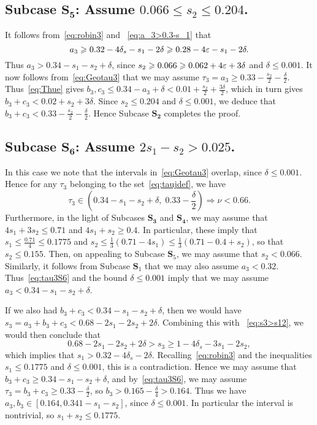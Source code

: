 \subsection*{Subcase $\mathbf{S_5}$: Assume $0.066\leq s_2\leq
0.204$.}

It follows from~\eqref{eq:robin3} and
~\eqref{eq:a_3>0.3-s_1} that
\[
a_3 \geqslant 0.32-4\delta_s-s_1 -2\delta \geqslant 0.28-4\varepsilon-s_1 -2\delta.
\]
Thus
$a_3>0.34-s_1-s_2 +\delta$, since $s_2\geqslant 0.066 \geqslant 0.062+4\varepsilon +3\delta$ and $\delta\leq 0.001$.
It now follows from~\eqref{eq:Geotau3} that we may assume $\tau_3=a_3 \geq 0.33
-\frac{s_2}{2}-
\frac{\delta}{2}$.
Thus~\eqref{eq:Thue} gives
$b_3,c_3 \le 0.34-a_3 +\delta< 0.01 +\frac{s_2}{2}+ \frac{3\delta}{2}$, which in turn gives
$b_3+c_3 < 0.02+s_2 +3\delta$.
Since $s_2\leq 0.204$ and $\delta\leq 0.001$, we deduce that
$b_3+c_3<0.33-\frac{s_2}{2}-\frac{\delta}{2}$. Hence
Subcase $\mathbf{S_2}$ completes the proof.


\subsection*{Subcase $\mathbf{S_6}$: Assume $2s_1-s_2>0.025$.}

In this case we note that the intervals in~\eqref{eq:Geotau3} overlap, since $\delta\leq 0.001$.
Hence for any $\tau_3$ belonging to the set~\eqref{eq:taujdef}, we have
\begin{equation}\label{eq:tau3S6}
\tau_3\in
 \left(0.34-s_1-s_2+ \delta, \;
 0.33-\frac{\delta}{2}\right)
 \Longrightarrow
\nu < 0.66.
\end{equation}
Furthermore,
in the light of Subcases $\mathbf{S_3}$ and $\mathbf{S_4}$, we may assume that
 $4s_1+3s_2\leq 0.71$ and $4s_1+s_2\geq 0.4$. In particular, these imply
 that $s_1\leq \frac{0.71}{4}\leq 0.1775$ and
 $s_2 \leq \frac{1}{3}(0.71 - 4s_1) \leq \frac{1}{3}(0.71-0.4+s_2)$, so that $s_2\leq 0.155$. Then, on appealing to Subcase
 $\mathbf{S}_5$, we may assume that $s_2< 0.066$. Similarly, it follows from Subcase $\mathbf{S}_1$ that we may also assume $a_3<0.32$. Thus~\eqref{eq:tau3S6} and the bound $\delta\leq 0.001$ imply that we may assume $a_3< 0.34-s_1-s_2+ \delta$.

If we also had $b_3+c_3<0.34-s_1-s_2+\delta$, then we would have $s_3 = a_3 + b_3 +c_3 < 0.68-2s_1-2s_2+2\delta$. Combining this with
~\eqref{eq:s3>s12}, we would then conclude that
\[
0.68-2s_1-2s_2+2\delta>
s_3 \ge 1-4\delta_s-3s_1-2s_2,
\]
which implies that
$s_1>0.32-4\delta_s-2\delta$.
Recalling~\eqref{eq:robin3} and the inequalities
$s_1\leq 0.1775$ and $\delta\leq 0.001$, this is a contradiction.
 Hence we may assume that $b_3+c_3\ge 0.34-s_1-s_2+ \delta$, and by~\eqref{eq:tau3S6}, we may assume $\tau_3=b_3+c_3\geq 0.33-\frac{\delta}{2}$, so $b_3>0.165-\frac{\delta}{4}> 0.164$. Thus we have $a_3,b_3\in [0.164, 0.341-s_1-s_2]$,
 since $\delta\leq 0.001$.
 In particular the interval is nontrivial, so $s_1+s_2\le 0.1775$.


